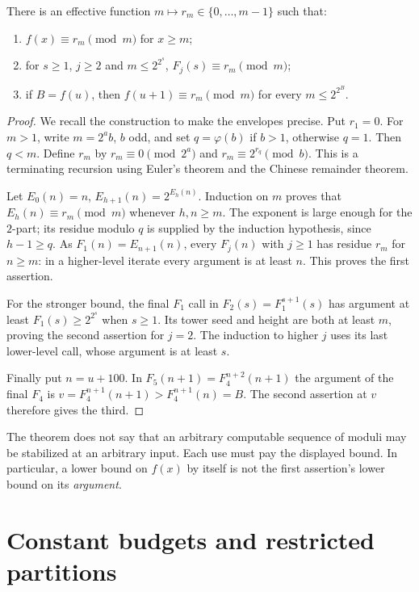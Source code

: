 \documentclass[11pt]{article}
\begin{document}
\begin{theorem}\label{thm:envelope}
There is an effective function $m\mapsto r_m\in\{0,\ldots,m-1\}$ such
that:
\begin{enumerate}
\item $f(x)\equiv r_m\pmod m$ for $x\ge m$;
\item for $s\ge1$, $j\ge2$ and $m\le2^{2^s}$,
      $F_j(s)\equiv r_m\pmod m$;
\item if $B=f(u)$, then
      $f(u+1)\equiv r_m\pmod m$ for every $m\le2^{2^B}$.
\end{enumerate}
\end{theorem}
\begin{proof}
We recall the construction to make the envelopes precise. Put $r_1=0$.
For $m>1$, write $m=2^a b$, $b$ odd, and set
$q=\varphi(b)$ if $b>1$, otherwise $q=1$. Then $q<m$.
Define $r_m$ by
$r_m\equiv0\pmod {2^a}$ and
$r_m\equiv2^{r_q}\pmod b$. This is a terminating recursion using
Euler's theorem and the Chinese remainder theorem.

Let $E_0(n)=n$, $E_{h+1}(n)=2^{E_h(n)}$.
Induction on $m$ proves that $E_h(n)\equiv r_m\pmod m$ whenever
$h,n\ge m$. The exponent is large enough for the $2$-part; its residue
modulo $q$ is supplied by the induction hypothesis, since $h-1\ge q$.
As $F_1(n)=E_{n+1}(n)$, every $F_j(n)$ with $j\ge1$ has residue
$r_m$ for $n\ge m$: in a higher-level iterate every argument is at
least $n$. This proves the first assertion.

For the stronger bound, the final $F_1$ call in
$F_2(s)=F_1^{s+1}(s)$ has argument at least
$F_1(s)\ge2^{2^s}$ when $s\ge1$. Its tower seed and height are both
at least $m$, proving the second assertion for $j=2$.
The induction to higher $j$ uses its last lower-level call, whose
argument is at least $s$.

Finally put $n=u+100$. In
$F_5(n+1)=F_4^{n+2}(n+1)$ the argument of the final $F_4$ is
$v=F_4^{n+1}(n+1)>F_4^{n+1}(n)=B$. The second assertion at $v$
therefore gives the third.
\end{proof}

The theorem does not say that an arbitrary computable sequence of
moduli may be stabilized at an arbitrary input. Each use must pay the
displayed bound. In particular, a lower bound on $f(x)$ by itself is
not the first assertion's lower bound on its \emph{argument}.

\section{Constant budgets and restricted partitions}
\end{document}
